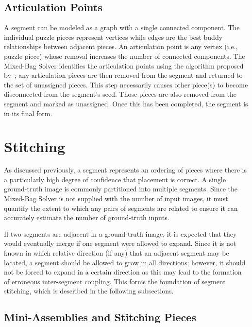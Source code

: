 \subsection{Articulation Points}\label{sec:articulationPoints}

A segment can be modeled as a graph with a single connected component.  The individual puzzle pieces represent vertices while edges are the best buddy relationships between adjacent pieces.  An articulation point is any vertex (i.e., puzzle piece) whose removal increases the number of connected components.  The Mixed-Bag Solver identifies the articulation points using the algorithm proposed by~\cite{cormenIntroToAlgorithms}; any articulation pieces are then removed from the segment and returned to the set of unassigned pieces.  This step necessarily causes other piece(s) to become disconnected from the segment's seed.  Those pieces are also removed from the segment and marked as unassigned. Once this has been completed, the segment is in its final form.

\section{Stitching}\label{sec:stitching}

As discussed previously, a segment represents an ordering of pieces where there is a particularly high degree of confidence that placement is correct.  A single ground-truth image is commonly partitioned into multiple segments. Since the Mixed-Bag Solver is not supplied with the number of input images, it must quantify the extent to which any pairs of segments are related to ensure it can accurately estimate the number of ground-truth inputs.  

If two segments are adjacent in a ground-truth image, it is expected that they would eventually merge if one segment were allowed to expand. Since it is not known in which relative direction (if any) that an adjacent segment may be located, a segment should be allowed to grow in all directions; however, it should not be forced to expand in a certain direction as this may lead to the formation of erroneous inter-segment coupling.  This forms the foundation of segment stitching, which is described in the following subsections.

\subsection{Mini-Assemblies and Stitching Pieces}

